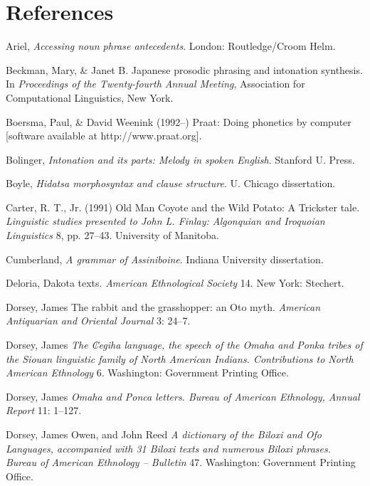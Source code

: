 \documentclass[output=paper]{LSP/langsci}
\begin{document}
\section*{References}


\printbibliography[heading=subbibliography,notkeyword=this]

\begin{reflist}

Ariel, \citet{Mira1990} \emph{Accessing noun phrase antecedents}. London: Routledge/Croom Helm. 

Beckman, Mary, \& Janet B. \citet{Pierrehumbert1986} Japanese prosodic phrasing and intonation synthesis. In \emph{Proceedings of the Twenty-fourth Annual Meeting}, Association for Computational Linguistics, New York.

Boersma, Paul, \& David Weenink (1992--) Praat: Doing phonetics by computer [software available at http://www.praat.org].

Bolinger, \citet{Dwight1986} \emph{Intonation and its parts: Melody in spoken English}. Stanford U. Press.

Boyle, \citet{John2007} \emph{Hidatsa morphosyntax and clause structure}. U. Chicago dissertation.

Carter, R. T., Jr. (1991) Old Man Coyote and the Wild Potato: A Trickster tale. \emph{Linguistic studies presented to John L. Finlay: Algonquian and Iroquoian Linguistics} 8, pp. 27--43. University of Manitoba.

Cumberland, \citet{Linda2005} \emph{A grammar of Assiniboine}. Indiana University dissertation.

Deloria, \citet{Ella1932} Dakota texts. \emph{American Ethnological Society} 14. New York: Stechert.

Dorsey, James \citet{Owen1880} The rabbit and the grasshopper: an Oto myth. \emph{American Antiquarian and Oriental Journal} 3: 24--7.

Dorsey, James \citet{Owen1890} \emph{The ₡egiha language, the speech of the Omaha and Ponka tribes of the Siouan linguistic family of North American Indians. Contributions to North American Ethnology} 6. Washington: Government Printing Office.

Dorsey, James \citet{Owen1891} \emph{Omaha and Ponca letters. Bureau of American Ethnology, Annual Report} 11: 1--127.

Dorsey, James Owen, and John Reed \citet{Swanton1912} \emph{A dictionary of the Biloxi and Ofo Languages, accompanied with 31 Biloxi texts and numerous Biloxi phrases. Bureau of American Ethnology -- Bulletin} 47. Washington: Government Printing Office.


\end{reflist}
\end{document}
